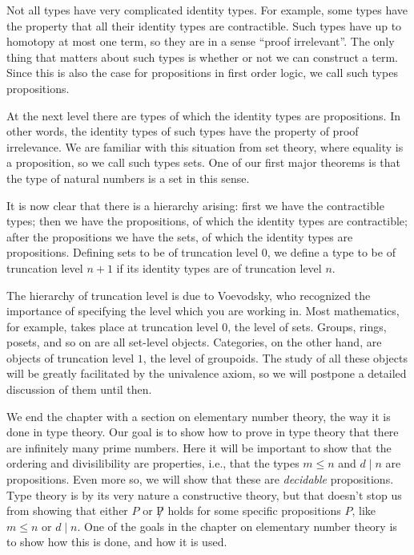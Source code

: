 \documentclass[10pt]{memoir} %
\begin{document}
Not all types have very complicated identity types. For example, some types have the property that all their identity types are contractible. Such types have up to homotopy at most one term, so they are in a sense ``proof irrelevant''. The only thing that matters about such types is whether or not we can construct a term. Since this is also the case for propositions in first order logic, we call such types propositions.

At the next level there are types of which the identity types are propositions. In other words, the identity types of such types have the property of proof irrelevance. We are familiar with this situation from set theory, where equality is a proposition, so we call such types sets. One of our first major theorems is that the type of natural numbers is a set in this sense.

It is now clear that there is a hierarchy arising: first we have the contractible types; then we have the propositions, of which the identity types are contractible; after the propositions we have the sets, of which the identity types are propositions. Defining sets to be of truncation level $0$, we define a type to be of truncation level $n+1$ if its identity types are of truncation level $n$.

The hierarchy of truncation level is due to Voevodsky, who recognized the importance of specifying the level which you are working in. Most mathematics, for example, takes place at truncation level $0$, the level of sets. Groups, rings, posets, and so on are all set-level objects. Categories, on the other hand, are objects of truncation level $1$, the level of groupoids. The study of all these objects will be greatly facilitated by the univalence axiom, so we will postpone a detailed discussion of them until then.

We end the chapter with a section on elementary number theory, the way it is done in type theory. Our goal is to show how to prove in type theory that there are infinitely many prime numbers. Here it will be important to show that the ordering and divisilibility are properties, i.e., that the types $m\leq n$ and $d\mid n$ are propositions. Even more so, we will show that these are \emph{decidable} propositions. Type theory is by its very nature a constructive theory, but that doesn't stop us from showing that either $P$ or $\not P$ holds for some specific propositions $P$, like $m\leq n$ or $d\mid n$. One of the goals in the chapter on elementary number theory is to show how this is done, and how it is used.
\end{document}
